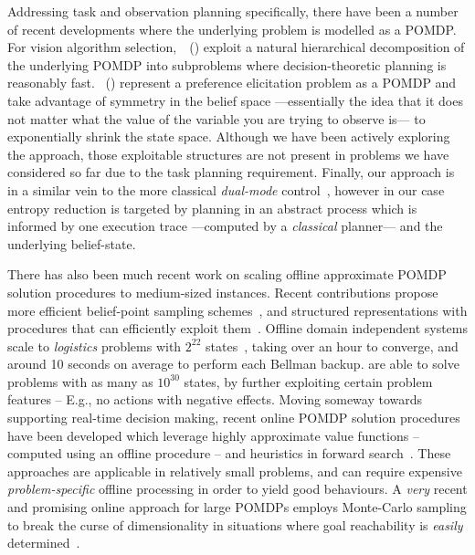 






Addressing task and observation planning specifically, there have been
a number of recent developments where the underlying problem is
modelled as a POMDP.
For vision algorithm
selection,~\citeauthor{hippo-jnl}~(\citeyear{hippo-jnl}) exploit a
natural hierarchical decomposition of the underlying POMDP into
subproblems where decision-theoretic planning is reasonably
fast. \citeauthor{doshi08:pref_elic}~(\citeyear{doshi08:pref_elic})
represent a preference elicitation problem as a POMDP and take
advantage of symmetry in the belief space ---essentially the idea that
it does not matter what the value of the variable you are trying to
observe is--- to exponentially shrink the state space. Although we
have been actively exploring the \citeauthor{doshi08:pref_elic}
approach, those exploitable structures are not present in problems we
have considered so far due to the task planning requirement. 
Finally,
our approach is in a similar vein to the more classical {\em
dual-mode} control~\cite{cassandra96actingunder}, however in our case
entropy reduction is targeted by planning in an abstract process which
is informed by one execution trace ---computed by a {\em classical}
planner--- and the underlying belief-state.


There has also been much recent work on scaling offline approximate
POMDP solution procedures to medium-sized instances. Recent
contributions propose more efficient belief-point sampling
schemes~\cite{kurniawati:etal:2010,shani:etal:08}, and structured
representations with procedures that can efficiently exploit
them~\cite{brunskill:russell:2010,shani:etal:2008}. Offline domain
independent systems scale to {\em logistics} problems with $2^{22}$
states~\cite{shani:etal:2008}, taking over an hour to converge, and
around 10 seconds on average to perform each Bellman
backup. \citeauthor{brunskill:russell:2010} are able to solve problems
with as many as $10^{30}$ states, by further exploiting certain
problem features -- E.g., no actions with negative effects.
Moving someway towards supporting real-time decision making, recent
online POMDP solution procedures have been developed which leverage
highly approximate value functions -- computed using an offline
procedure -- and heuristics in forward
search~\cite{ross:etal:2008}. These approaches are applicable in
relatively small problems, and can require
expensive \emph{problem-specific} offline processing in order to yield
good behaviours.
A {\em very} recent and promising online approach for
large POMDPs employs Monte-Carlo sampling to break the curse of
dimensionality in situations where goal reachability is {\em easily}
determined~\cite{silver:veness:2010}. 

